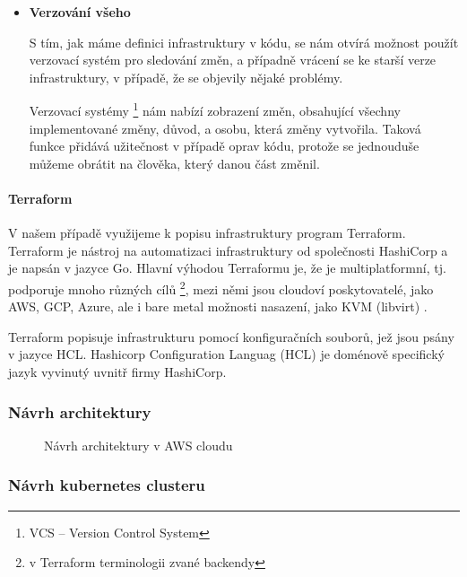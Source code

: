 \documentclass[thesis=M,czech]{FITthesis}[2019/12/23]
\theoremstyle{plain}
\theoremstyle{definition}
\begin{document}
\begin{itemize}
	\item \textbf{Verzování všeho} 

	S tím, jak máme definici infrastruktury v kódu, se nám otvírá možnost použít verzovací systém pro sledování změn, a případně vrácení se ke starší verze infrastruktury, v případě, že se objevily nějaké problémy.

	Verzovací systémy \footnote{VCS -- Version Control System} nám nabízí zobrazení změn, obsahující všechny implementované změny, důvod, a osobu, která změny vytvořila. Taková funkce přidává užitečnost v případě oprav kódu, protože se jednouduše můžeme obrátit na člověka, který danou část změnil. 
\end{itemize}

\paragraph{Terraform}

V našem případě využijeme k popisu infrastruktury program Terraform. Terraform je nástroj na automatizaci infrastruktury od společnosti HashiCorp a je napsán v jazyce Go. Hlavní výhodou Terraformu je, že je multiplatformní, tj. podporuje mnoho různých cílů \footnote{v Terraform terminologii zvané backendy}, mezi němi jsou  cloudoví poskytovatelé, jako AWS, GCP, Azure, ale i bare metal  možnosti nasazení, jako KVM (libvirt) \cite{tf-libvirt}.


Terraform popisuje infrastrukturu pomocí konfiguračních souborů, jež jsou psány v jazyce HCL. Hashicorp Configuration Languag (HCL) je doménově specifický jazyk vyvinutý uvnitř firmy HashiCorp.

\subsubsection{Návrh architektury}


\begin{figure}[H]\centering
	

	\caption[Návrh architektury v AWS cloudu]{Návrh architektury v AWS cloudu}\label{fig:float}
\end{figure}


\subsubsection{Návrh kubernetes clusteru}
\end{document}

